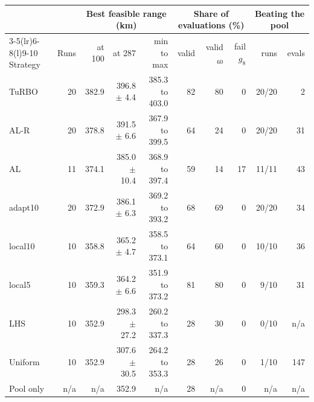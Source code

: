 \begin{tabular*}{\linewidth}{@{\extracolsep{\fill}}lrrrrrrrrr@{}}
\toprule
 & & \multicolumn{3}{c}{Best feasible range (km)} & \multicolumn{3}{c}{Share of evaluations (\%)} & \multicolumn{2}{c}{Beating the pool} \\
\cmidrule(lr){3-5}\cmidrule(lr){6-8}\cmidrule(l){9-10}
Strategy & Runs & at 100 & at 287 & min to max & valid & valid$_{60}$ & fail $g_8$ & runs & evals \\
\midrule
TuRBO & 20 & 382.9 & 396.8 $\pm$ 4.4 & 385.3 to 403.0 & 82 & 80 & 0 & 20/20 & 2 \\
AL-R & 20 & 378.8 & 391.5 $\pm$ 6.6 & 367.9 to 399.5 & 64 & 24 & 0 & 20/20 & 31 \\
AL & 11 & 374.1 & 385.0 $\pm$ 10.4 & 368.9 to 397.4 & 59 & 14 & 17 & 11/11 & 43 \\
adapt10 & 20 & 372.9 & 386.1 $\pm$ 6.3 & 369.2 to 393.2 & 68 & 69 & 0 & 20/20 & 34 \\
local10 & 10 & 358.8 & 365.2 $\pm$ 4.7 & 358.5 to 373.1 & 64 & 60 & 0 & 10/10 & 36 \\
local5 & 10 & 359.3 & 364.2 $\pm$ 6.6 & 351.9 to 373.2 & 81 & 80 & 0 & 9/10 & 31 \\
LHS & 10 & 352.9 & 298.3 $\pm$ 27.2 & 260.2 to 337.3 & 28 & 30 & 0 & 0/10 & n/a \\
Uniform & 10 & 352.9 & 307.6 $\pm$ 30.5 & 264.2 to 353.3 & 28 & 26 & 0 & 1/10 & 147 \\
\midrule
Pool only & n/a & n/a & 352.9 & n/a & 28 & n/a & 0 & n/a & n/a \\
\bottomrule
\end{tabular*}
